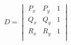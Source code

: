 \documentclass[12pt]{article}
\begin{document}
\[
    D = \begin{vmatrix}
        P_x & P_y & 1 \\
        Q_x & Q_y & 1 \\
        R_x & R_y & 1 \\
    \end{vmatrix}
\]
\end{document}
